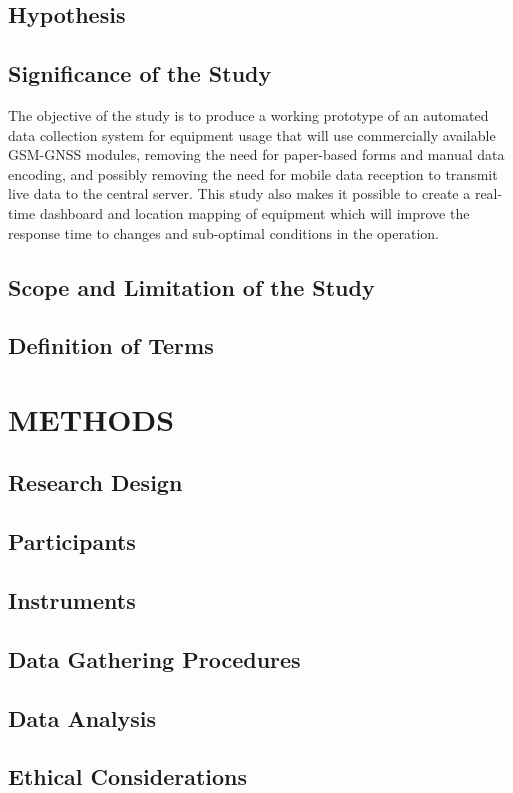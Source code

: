 \documentclass[12pt]{report}
\begin{document}
\section{Hypothesis}

\section{Significance of the Study}

The objective of the study is to produce a working prototype of an automated data collection system for equipment usage that will use commercially available GSM-GNSS modules, removing the need for paper-based forms and manual data encoding, and possibly removing the need for mobile data reception to transmit live data to the central server.
This study also makes it possible to create a real-time dashboard and location mapping of equipment which will improve the response time to changes and sub-optimal conditions in the operation.

\section{Scope and Limitation of the Study}

\section{Definition of Terms}

\chapter{METHODS}

\section{Research Design}

\section{Participants}

\section{Instruments}

\section{Data Gathering Procedures}

\section{Data Analysis}

\section{Ethical Considerations}

\printbibliography[
    title = {REFERENCES},
    heading = bibintoc
]
\end{document}

